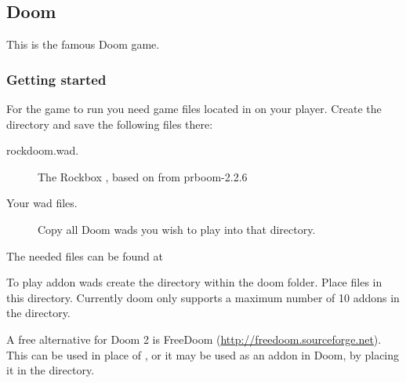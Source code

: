 \subsection{Doom}
This is the famous Doom game.

\subsubsection{Getting started}
For the game to run you need  game files located in
 on your player. Create the directory and save the
following files there:
\begin{description}
\item[rockdoom.wad.] The Rockbox , based on 
from prboom-2.2.6
\item[Your wad files.] Copy all Doom wads you wish to play into that directory.
\end{description}
The needed files can be found at

To play addon wads create the  directory within the doom folder.
Place  files in this directory. Currently doom only supports 
a maximum number of 10 addons 
in the directory.

A free alternative for Doom 2 is FreeDoom (\url{http://freedoom.sourceforge.net}).
This can be used in place of , or it may be used as an addon in 
Doom, by placing it in the  directory.

